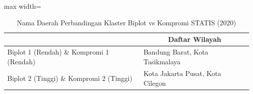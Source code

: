 \begin{table}[H]
\centering
\caption{Nama Daerah Perbandingan Klaster Biplot vs Kompromi STATIS (2020)} \label{tab:sample1biplot_comp_name_2020}
\begin{adjustbox}{max width=\textwidth}
\begin{tabular}{|>{\centering\arraybackslash}p{4cm}|p{10cm}|}
\hline
\multicolumn{1}{|c|}{\textbf{Kategori}} & \multicolumn{1}{c|}{\textbf{Daftar Wilayah}} \\
\hline
Biplot 1 (Rendah) \& Kompromi 1 (Rendah) & Bandung Barat, Kota Tasikmalaya \\
\hline
Biplot 2 (Tinggi) \& Kompromi 2 (Tinggi) & Kota Jakarta Pusat, Kota Cilegon \\
\hline
\end{tabular}
\end{adjustbox}
\end{table}